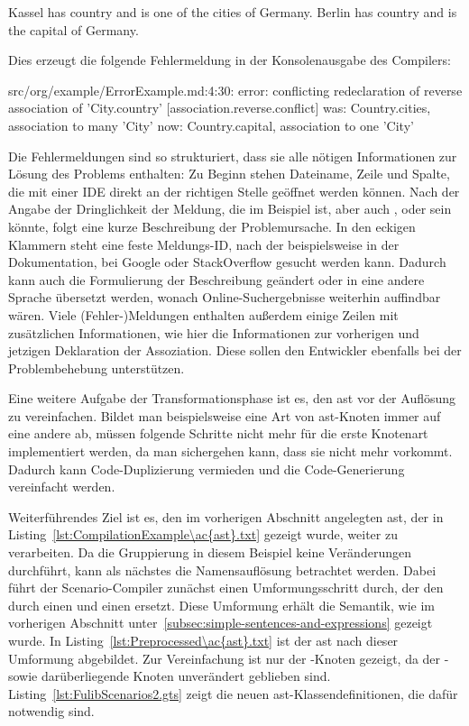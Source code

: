 \begin{codeblock}
    Kassel has country and is one of the cities of Germany.
    Berlin has country and is the capital of Germany.
\end{codeblock}

Dies erzeugt die folgende Fehlermeldung in der Konsolenausgabe des Compilers:

\begin{codeblock}
    src/org/example/ErrorExample.md:4:30: error: conflicting redeclaration of reverse association of 'City.country' [association.reverse.conflict]
    was: Country.cities, association to many 'City'
    now: Country.capital, association to one 'City'
\end{codeblock}

Die Fehlermeldungen sind so strukturiert, dass sie alle nötigen Informationen zur Lösung des Problems enthalten:
Zu Beginn stehen Dateiname, Zeile und Spalte, die mit einer IDE direkt an der richtigen Stelle geöffnet werden können.
Nach der Angabe der Dringlichkeit der Meldung, die im Beispiel  ist, aber auch ,  oder  sein könnte, folgt eine kurze Beschreibung der Problemursache.
In den eckigen Klammern steht eine feste Meldungs-ID, nach der beispielsweise in der Dokumentation, bei Google oder StackOverflow gesucht werden kann.
Dadurch kann auch die Formulierung der Beschreibung geändert oder in eine andere Sprache übersetzt werden, wonach Online-Suchergebnisse weiterhin auffindbar wären.
Viele (Fehler-)Meldungen enthalten außerdem einige Zeilen mit zusätzlichen Informationen, wie hier die Informationen zur vorherigen und jetzigen Deklaration der Assoziation.
Diese sollen den Entwickler ebenfalls bei der Problembehebung unterstützen.

Eine weitere Aufgabe der Transformationsphase ist es, den \ac{ast} vor der Auflösung zu vereinfachen.
Bildet man beispielsweise eine Art von \ac{ast}-Knoten immer auf eine andere ab, müssen folgende Schritte nicht mehr für die erste Knotenart implementiert werden, da man sichergehen kann, dass sie nicht mehr vorkommt.
Dadurch kann Code-Duplizierung vermieden und die Code-Generierung vereinfacht werden.

Weiterführendes Ziel ist es, den im vorherigen Abschnitt angelegten \ac{ast}, der in Listing~\ref{lst:CompilationExample\ac{ast}.txt} gezeigt wurde, weiter zu verarbeiten.
Da die Gruppierung in diesem Beispiel keine Veränderungen durchführt, kann als nächstes die Namensauflösung betrachtet werden.
Dabei führt der Scenario-Compiler zunächst einen Umformungsschritt durch, der den  durch einen  und einen  ersetzt.
Diese Umformung erhält die Semantik, wie im vorherigen Abschnitt unter~\ref{subsec:simple-sentences-and-expressions} gezeigt wurde.
In Listing~\ref{lst:Preprocessed\ac{ast}.txt} ist der \ac{ast} nach dieser Umformung abgebildet.
Zur Vereinfachung ist nur der -Knoten gezeigt, da der - sowie darüberliegende Knoten unverändert geblieben sind.
Listing~\ref{lst:FulibScenarios2.gts} zeigt die neuen \ac{ast}-Klassendefinitionen, die dafür notwendig sind.

